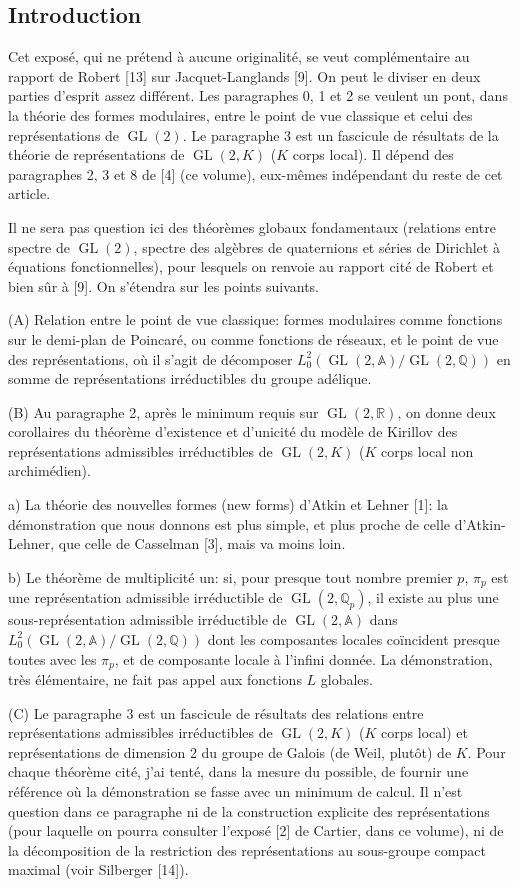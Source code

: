 \documentclass[10pt,a4paper]{article}
\providecommand{\GL}{\operatorname{GL}}
\providecommand{\R}{\mathbb R}
\providecommand{\Q}{\mathbb Q}
\providecommand{\A}{\mathbb A}
\begin{document}
\clearpage
{}
\hypertarget{authority-2}{}
\subsection*{Introduction}
Cet exposé, qui ne prétend à aucune originalité, se veut complémentaire au rapport de Robert [13] sur Jacquet-Langlands [9]. On peut le diviser en deux parties d'esprit assez différent. Les paragraphes 0, 1 et 2 se veulent un pont, dans la théorie des formes modulaires, entre le point de vue classique et celui des représentations de $\GL(2)$. Le paragraphe 3 est un fascicule de résultats de la théorie de représentations de $\GL(2,K)$ ($K$ corps local). Il dépend des paragraphes 2, 3 et 8 de [4] (ce volume), eux-mêmes indépendant du reste de cet article.

Il ne sera pas question ici des théorèmes globaux fondamentaux (relations entre spectre de $\GL(2)$, spectre des algèbres de quaternions et séries de Dirichlet à équations fonctionnelles), pour lesquels on renvoie au rapport cité de Robert et bien sûr à [9]. On s'étendra sur les points suivants.

(A) Relation entre le point de vue classique: formes modulaires comme fonctions sur le demi-plan de Poincaré, ou comme fonctions de réseaux, et le point de vue des représentations, où il s'agit de décomposer $L_0^2(\GL(2,\A)/\GL(2,\Q))$ en somme de représentations irréductibles du groupe adélique.

(B) Au paragraphe 2, après le minimum requis sur $\GL(2,\R)$, on donne deux corollaires du théorème d'existence et d'unicité du modèle de Kirillov des représentations admissibles irréductibles de $\GL(2,K)$ ($K$ corps local non archimédien).

a) La théorie des nouvelles formes (new forms) d'Atkin et Lehner [1]: la démonstration que nous donnons est plus simple, et plus proche de celle d'Atkin-Lehner, que celle de Casselman [3], mais va moins loin.

b) Le théorème de multiplicité un: si, pour presque tout nombre premier $p$, $\pi_p$ est une représentation admissible irréductible de $\GL(2,\Q_p)$, il existe au plus une sous-représentation admissible irréductible de $\GL(2,\A)$ dans $L_0^2(\GL(2,\A)/\GL(2,\Q))$ dont les composantes locales coïncident presque toutes avec les $\pi_p$, et de composante locale à l'infini donnée. La démonstration, très élémentaire, ne fait pas appel aux fonctions $L$ globales.

\clearpage
{}
\hypertarget{authority-3}{}
(C) Le paragraphe 3 est un fascicule de résultats des relations entre représentations admissibles irréductibles de $\GL(2,K)$ ($K$ corps local) et représentations de dimension 2 du groupe de Galois (de Weil, plutôt) de $K$. Pour chaque théorème cité, j'ai tenté, dans la mesure du possible, de fournir une référence où la démonstration se fasse avec un minimum de calcul. Il n'est question dans ce paragraphe ni de la construction explicite des représentations (pour laquelle on pourra consulter l'exposé [2] de Cartier, dans ce volume), ni de la décomposition de la restriction des représentations au sous-groupe compact maximal (voir Silberger [14]).
\end{document}
